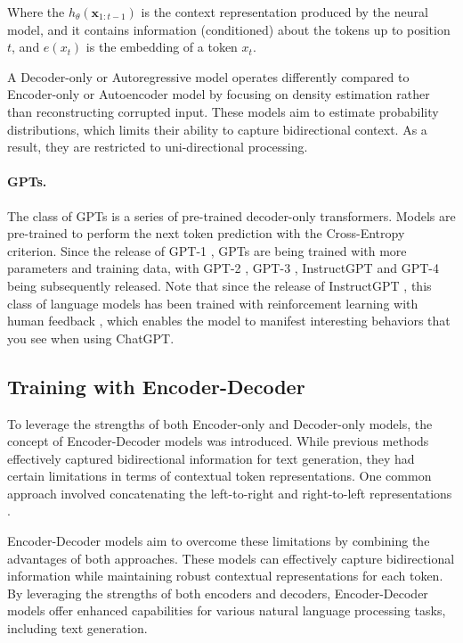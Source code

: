 Where the $h_{\theta}(\textbf{x}_{1:t-1})$ is the context representation produced by the neural model, and it contains information (conditioned) about the tokens up to position $t$, and $e(x_t)$ is the embedding of a token $x_t$.

A Decoder-only or Autoregressive model operates differently compared to Encoder-only or Autoencoder model by focusing on density estimation rather than reconstructing corrupted input. These models aim to estimate probability distributions, which limits their ability to capture bidirectional context. As a result, they are restricted to uni-directional processing.

\paragraph{GPTs.} The class of GPTs is a series of pre-trained decoder-only transformers. Models are pre-trained to perform the next token prediction with the Cross-Entropy criterion. Since the release of GPT-1 \citep{gpt-1}, GPTs are being trained with more parameters and training data, with GPT-2 \citep{gpt-2}, GPT-3 
\citep{gpt-3}, InstructGPT \citep{instructgpt} and GPT-4 \citep{gpt-4} being subsequently released. Note that since the release of InstructGPT \citep{instructgpt}, this class of language models has been trained with reinforcement learning with human feedback \citep{rlhf}, which enables the model to manifest interesting behaviors that you see when using ChatGPT.


\subsection{Training with Encoder-Decoder}
To leverage the strengths of both Encoder-only and Decoder-only models, the concept of Encoder-Decoder models was introduced. While previous methods effectively captured bidirectional information for text generation, they had certain limitations in terms of contextual token representations. One common approach involved concatenating the left-to-right and right-to-left representations \cite{peters2018deep}.

Encoder-Decoder models aim to overcome these limitations by combining the advantages of both approaches. These models can effectively capture bidirectional information while maintaining robust contextual representations for each token. By leveraging the strengths of both encoders and decoders, Encoder-Decoder models offer enhanced capabilities for various natural language processing tasks, including text generation.

